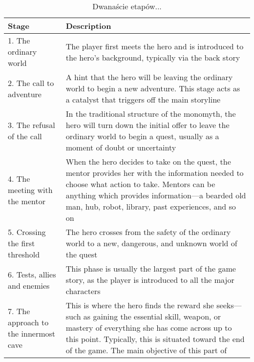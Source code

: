 \begin{table}[h!]
	\caption{Dwanaście etapów...}
	\label{tab1:ch1_1_1}
	\begin{center}
		\begin{tabular}{p{1.5in} p{4in}}
			\hline
			Stage                                 & Description                                                         \\
			\hline
			1. The ordinary world                 & The player first meets the hero and is introduced to the hero’s
			background, typically via the back story                                                                    \\
			2. The call to adventure              & A hint that the hero will be leaving the ordinary world to begin a
			new adventure. This stage acts as a catalyst that triggers off the
			main storyline                                                                                              \\
			3. The refusal of the call            & In the traditional structure of the monomyth, the hero will turn
			down the initial offer to leave the ordinary world to begin a
			quest, usually as a moment of doubt or uncertainty                                                          \\
			4. The meeting with the mentor        & When the hero decides to take on the quest, the mentor
			provides her with the information needed to choose what action
			to take. Mentors can be anything which provides information—a
			bearded old man, hub, robot, library, past experiences, and so
			on                                                                                                          \\
			5. Crossing the first threshold       & The hero crosses from the safety of the ordinary world to a
			new, dangerous, and unknown world of the quest                                                              \\
			6. Tests, allies and enemies          & This phase is usually the largest part of the game story, as the
			player is introduced to all the major characters                                                            \\
			7. The approach to the innermost cave & This is where the hero finds the reward she seeks—such as
			gaining the essential skill, weapon, or mastery of everything she
			has come across up to this point. Typically, this is situated
			toward the end of the game. The main objective of this part of

\end{tabular}
\end{center}
\end{table}
